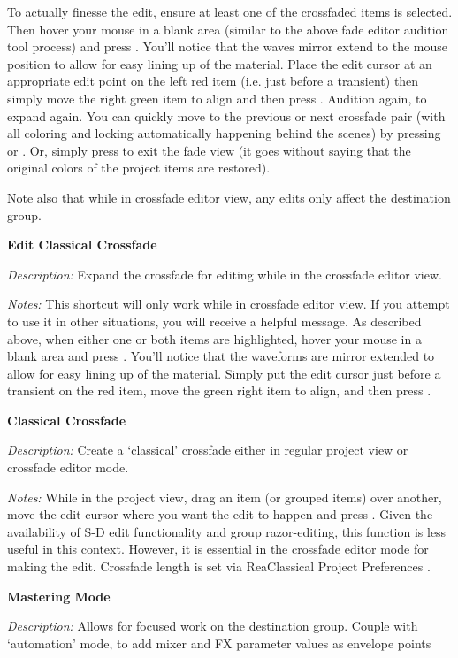 \documentclass[10pt,american]{article}
\begin{document}
To actually finesse the edit, ensure at least one of the crossfaded items is
selected. Then hover your mouse in a blank area (similar to the above fade
editor audition tool process) and press . You'll notice that the waves
mirror extend to the mouse position to allow for easy lining up of the material.
Place the edit cursor at an appropriate edit point on the left red item (i.e.
just before a transient) then simply move the right green item to align and then
press . Audition again,  to expand again. You can quickly move
to the previous or next crossfade pair (with all coloring and locking
automatically happening behind the scenes) by pressing  or . Or,
simply press  to exit the fade view (it goes without saying that the
original colors of the project items are restored).

Note also that while in crossfade editor view, any edits only affect the
destination group.

\textbf{Edit Classical Crossfade }

\emph{Description: }Expand the crossfade for editing while in the crossfade
editor view.

\emph{Notes:} This shortcut will only work while in crossfade editor view. If
you attempt to use it in other situations, you will receive a helpful message.
As described above, when either one or both items are highlighted, hover your
mouse in a blank area and press  . You'll notice that the waveforms are
mirror extended to allow for easy lining up of the material. Simply put the edit
cursor just before a transient on the red item, move the green right item to
align, and then press . 

\textbf{Classical Crossfade }

\emph{Description: }Create a `classical' crossfade either in regular project
view or crossfade editor mode.

\emph{Notes: }While in the project view, drag an item (or grouped items) over
another, move the edit cursor where you want the edit to happen and press
. Given the availability of S-D edit functionality and group
razor-editing, this function is less useful in this context. However, it is
essential in the crossfade editor mode for making the edit. Crossfade length is
set via ReaClassical Project Preferences  .

\textbf{Mastering Mode }

\emph{Description:} Allows for focused work on the destination group. Couple
with `automation' mode, to add mixer and FX parameter values as envelope points
\end{document}
